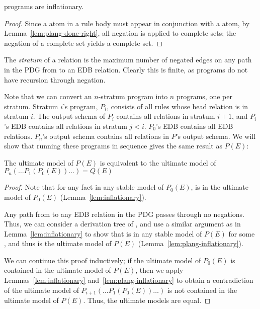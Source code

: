 \begin{lemma}
\label{lem:plang-inflationary}
\plang programs are inflationary.
\end{lemma}
\begin{proof}
Since a  atom in a rule body must appear in conjunction with a  atom, by Lemma~\ref{lem:plang-done-right}, all negation is applied to complete sets; the negation of a complete set yields a complete set.
\end{proof}


The {\em stratum} of a relation  is the maximum number of negated edges on any path in the PDG from  to an EDB relation.  Clearly this is finite, as \plang programs do not have recursion through negation.

Note that we can convert an $n$-stratum \plang program into $n$ \slang programs, one per stratum.  Stratum $i$'s program, $P_i$, consists of all rules whose head relation is in stratum $i$.  The output schema of $P_i$ contains all relations in stratum $i+1$, and $P_i$'s EDB contains all relations in stratum $j < i$.  $P_0$'s EDB contains all EDB relations.  $P_n$'s output schema contains all relations in $P$'s output schema.  We will show that running these programs in sequence gives the same result as $P(E)$:

\begin{lemma}
\label{lem:can-stratify}
The ultimate model of $P(E)$ is equivalent to the ultimate model of $P_n(\ldots P_1(P_0(E)) \ldots ) = Q(E)$
\end{lemma}
\begin{proof}
Note that for any fact  in any stable model of $P_0(E)$,  is in the ultimate model of $P_0(E)$ (Lemma~\ref{lem:inflationary}).

Any path from  to any EDB relation in the PDG passes through no negations.  Thus, we can consider a derivation tree of , and use a similar argument as in Lemma~\ref{lem:inflationary} to show that  is in any stable model of $P(E)$ for some , and thus is the ultimate model of $P(E)$ (Lemma~\ref{lem:plang-inflationary}).

We can continue this proof inductively; if the ultimate model of $P_0(E)$ is contained in the ultimate model of $P(E)$, then we apply Lemmas~\ref{lem:inflationary} and~\ref{lem:plang-inflationary} to obtain a contradiction of the ultimate model of $P_{i+1}(\ldots P_1(P_0(E)) \ldots)$ is not contained in the ultimate model of $P(E)$.  Thus, the ultimate models are equal.
\end{proof}

